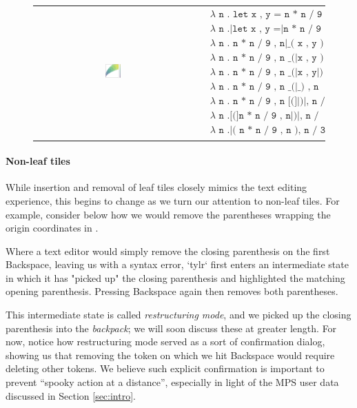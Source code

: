\begin{figure}
  \begin{tabular}{cp{}}
  \includegraphics[width=0.1\textwidth]{img/circles-parabola-grow-2.png}
  &
  {
    \begin{align*}
      & \texttt{$\lambda$ n . let x , y = n * n / 9 , n|in ( x , y ) , n / 3} \\
      & \texttt{$\lambda$ n .|let x , y =|n * n / 9 , n[in] ( x , y ) , n / 3} \\
      & \texttt{$\lambda$ n . n * n / 9 , n|\_ ( x , y ) , n / 3} \\
      & \texttt{$\lambda$ n . n * n / 9 , n \_ (|x , y ) , n / 3} \\
      & \texttt{$\lambda$ n . n * n / 9 , n \_ (|x , y|) , n / 3} \\
      & \texttt{$\lambda$ n . n * n / 9 , n \_ (|\_ ) , n / 3} \\
      & \texttt{$\lambda$ n . n * n / 9 , n [(]|)|, n / 3} \\
      & \texttt{$\lambda$ n .[(]n * n / 9 , n|)|, n / 3} \\
      & \texttt{$\lambda$ n .|( n * n / 9 , n ), n / 3}
    \end{align*}
  }
  \end{tabular}
\end{figure}

\paragraph{Non-leaf tiles}
While insertion and removal of leaf tiles closely mimics the
text editing experience, this begins to change as we turn our
attention to non-leaf tiles.
For example, consider below how we would remove the parentheses
wrapping the origin coordinates in \tylr.


Where a text editor would simply remove the closing parenthesis
on the first Backspace, leaving us with a syntax error,
`tylr` first enters an intermediate state in which it has
"picked up" the closing parenthesis and highlighted the
matching opening parenthesis.
Pressing Backspace again then removes both parentheses.

This intermediate state is called \emph{restructuring mode},
and we picked up the closing parenthesis into the \emph{backpack};
we will soon discuss these at greater length.
For now, notice how restructuring mode served as a
sort of confirmation dialog, showing us that removing
the token on which we hit Backspace would require
deleting other tokens.
We believe such explicit confirmation is important to
prevent ``spooky action at a distance'', especially
in light of the MPS user data discussed in Section \ref{sec:intro}.

